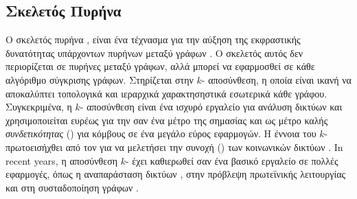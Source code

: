 \subsection{Σκελετός Πυρήνα }
\label{ssec:core}
Ο σκελετός πυρήνα , είναι ένα τέχνασμα για την αύξηση της εκφραστικής δυνατότητας υπάρχοντων πυρήνων μεταξύ γράφων \cite{nikolentzos2018}.
Ο σκελετός αυτός δεν περιορίζεται σε πυρήνες μεταξύ γράφων, αλλά μπορεί να εφαρμοσθεί σε κάθε αλγόριθμο σύγκρισης γράφων.
Στηρίζεται στην $k$- αποσύνθεση, η οποία είναι ικανή να αποκαλύπτει τοπολογικά και ιεραρχικά χαρακτησηστικά εσωτερικά κάθε γράφου.
Συγκεκριμένα, η $k$- αποσύνθεση είναι ένα ισχυρό εργαλείο για ανάλυση δικτύων και χρησιμοποιείται ευρέως για την σαν ένα μέτρο της σημασίας και ως μέτρο καλής \textit{συνδετικότητας} () για κόμβους σε ένα μεγάλο εύρος εφαρμογών.
Η έννοια του $k$- πρωτοεισήχθει από τον  για να μελετήσει την συνοχή () των κοινωνικών δικτύων \cite{seidman1983network}.
In recent years, η αποσύνθεση $k$- έχει καθιερωθεί σαν ένα βασικό εργαλείο σε πολλές εφαρμογές, όπως η αναπαράσταση δικτύων \cite{alvarez2006large}, στην πρόβλεψη πρωτεϊνικής λειτουργίας \cite{wuchty2005peeling} και στη συσταδοποίηση γράφων \cite{giatsidis2014corecluster}.


